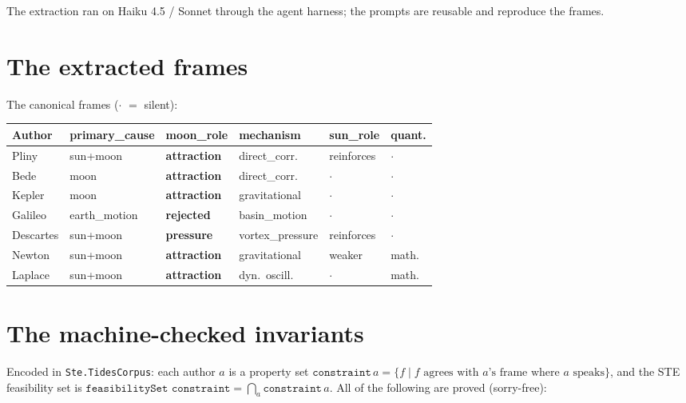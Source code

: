 \documentclass[11pt]{article}
\newcommand{\lean}[1]{\texttt{#1}}
\newcommand{\vv}[1]{\textsf{\small #1}}
\begin{document}
The extraction ran on Haiku 4.5 / Sonnet through the agent harness; the
prompts are reusable and reproduce the frames.

\section{The extracted frames}

The canonical frames (\vv{$\cdot$} $=$ silent):

\begin{center}\small
\setlength{\tabcolsep}{4pt}
\begin{tabular}{@{}l l l l l l@{}}
\toprule
Author & primary\_cause & moon\_role & mechanism & sun\_role & quant. \\
\midrule
Pliny     & sun+moon    & \textbf{attraction} & direct\_corr.   & reinforces & $\cdot$ \\
Bede      & moon        & \textbf{attraction} & direct\_corr.   & $\cdot$    & $\cdot$ \\
Kepler    & moon        & \textbf{attraction} & gravitational   & $\cdot$    & $\cdot$ \\
Galileo   & earth\_motion & \textbf{rejected} & basin\_motion   & $\cdot$    & $\cdot$ \\
Descartes & sun+moon    & \textbf{pressure}   & vortex\_pressure& reinforces & $\cdot$ \\
Newton    & sun+moon    & \textbf{attraction} & gravitational   & weaker     & math. \\
Laplace   & sun+moon    & \textbf{attraction} & dyn.\ oscill.   & $\cdot$    & math. \\
\bottomrule
\end{tabular}
\end{center}

\section{The machine-checked invariants}

Encoded in \lean{Ste.TidesCorpus}: each author $a$ is a property set
$\lean{constraint}\,a = \{f \mid f \text{ agrees with } a\text{'s frame
where } a \text{ speaks}\}$, and the STE feasibility set is
$\lean{feasibilitySet constraint} = \bigcap_a \lean{constraint}\,a$. All
of the following are proved (sorry-free):
\end{document}
